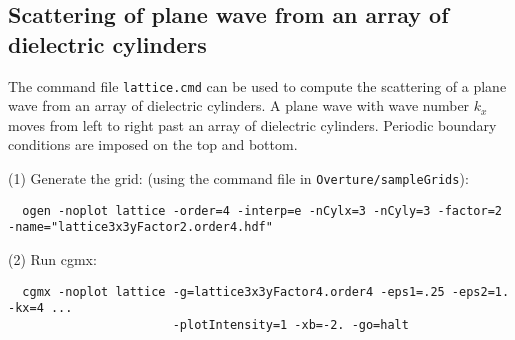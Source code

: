\documentclass{article}
\begin{document}
\clearpage
\subsection{Scattering of plane wave from an array of dielectric cylinders} \label{sec:dielectricCylArray}

The command file {\tt lattice.cmd} can be used to compute the scattering
of a plane wave from an array of dielectric cylinders. A plane wave with wave number $k_x$ 
moves from left to right past an
array of dielectric cylinders. Periodic boundary conditions are imposed on the top and bottom. 


\noindent (1) Generate the grid: (using the command file in {\tt Overture/sampleGrids}):
{\small
\begin{verbatim}
  ogen -noplot lattice -order=4 -interp=e -nCylx=3 -nCyly=3 -factor=2 -name="lattice3x3yFactor2.order4.hdf"
\end{verbatim}
}
\noindent (2) Run cgmx: 
\begin{verbatim}
  cgmx -noplot lattice -g=lattice3x3yFactor4.order4 -eps1=.25 -eps2=1. -kx=4 ...
                       -plotIntensity=1 -xb=-2. -go=halt
\end{verbatim}
\end{document}
